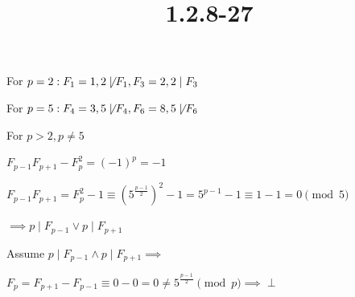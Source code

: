 \documentclass{article}
\title{1.2.8-27}
\begin{document}
\maketitle

For \( p = 2: F_1 = 1, 2 \not\mid F_1, F_3 = 2, 2 \mid F_3 \)

For \( p = 5: F_4 = 3, 5 \not\mid F_4, F_6 = 8, 5 \not\mid F_6 \)

For \( p > 2, p \neq 5 \)

\( F_{p-1}F_{p+1} - F_p^2 = (-1)^p = -1 \)

\( F_{p-1}F_{p+1} = F_p^2 - 1 \equiv (5^{\frac{p-1}{2}})^2 -1 = 5^{p-1} - 1 \equiv 1 -1 = 0\pmod{5} \)

\( \implies p \mid F_{p-1} \lor p \mid F_{p+1} \)

Assume \( p \mid F_{p-1} \land p \mid F_{p+1} \implies \)

\( F_p = F_{p+1} - F_{p-1} \equiv 0 - 0 = 0 \neq 5^{\frac{p-1}{2}} \pmod p \implies \perp \)
\end{document}
